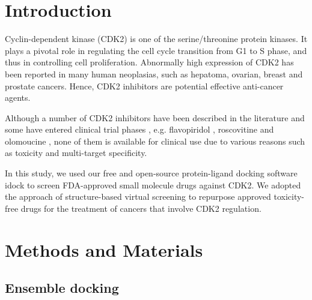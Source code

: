\documentclass[10pt]{article}
\begin{document}

\section*{Introduction}
Cyclin-dependent kinase (CDK2) is one of the serine/threonine protein kinases. It plays a pivotal role in regulating the cell cycle transition from G1 to S phase, and thus in controlling cell proliferation. Abnormally high expression of CDK2 has been reported in many human neoplasias, such as hepatoma, ovarian, breast and prostate cancers. Hence, CDK2 inhibitors are potential effective anti-cancer agents.

Although a number of CDK2 inhibitors have been described in the literature and some have entered clinical trial phases \cite{1603}, e.g. flavopiridol \cite{1596}, roscovitine \cite{1597} and olomoucine \cite{1598}, none of them is available for clinical use due to various reasons such as toxicity and multi-target specificity.

In this study, we used our free and open-source protein-ligand docking software idock \cite{1153,1362} to screen FDA-approved small molecule drugs against CDK2. We adopted the approach of structure-based virtual screening to repurpose approved toxicity-free drugs for the treatment of cancers that involve CDK2 regulation.

\section*{Methods and Materials}

\subsection*{Ensemble docking}
\end{document}
